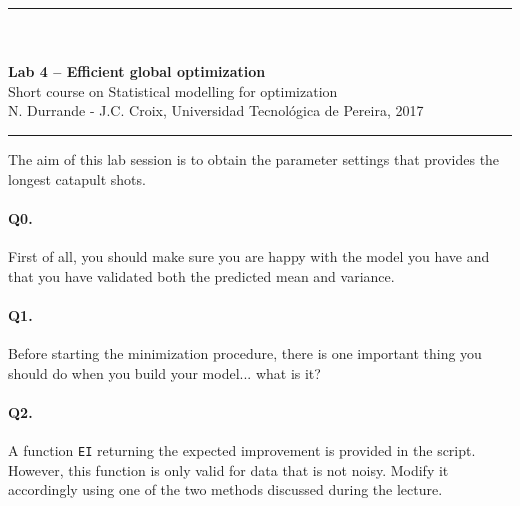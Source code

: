 \documentclass[12pt]{scrartcl}
\begin{document}
\begin{center}
	\rule{\textwidth}{1pt}
	\\ \ \\
	{\LARGE \textbf{Lab 4 -- Efficient global optimization}}\\
	\vspace{3mm}
	{\large Short course on Statistical modelling for optimization\\ \vspace{3mm}}
	{\normalsize N. Durrande - J.C. Croix, Universidad Tecnol\'ogica de Pereira, 2017}\\
	\vspace{3mm}
	\rule{\textwidth}{1pt}
	\vspace{5mm}
\end{center}
The aim of this lab session is to obtain the parameter settings that provides the longest catapult shots.



\paragraph{Q0.} First of all, you should make sure you are happy with the model you have and that you have validated both the predicted mean and variance.

\paragraph{Q1.} Before starting the minimization procedure, there is one important thing you should do when you build your model... what is it?

\paragraph{Q2.} A function \texttt{EI} returning the expected improvement is provided in the script. However, this function is only valid for data that is not noisy. Modify it accordingly using one of the two methods discussed during the lecture.
\end{document}
